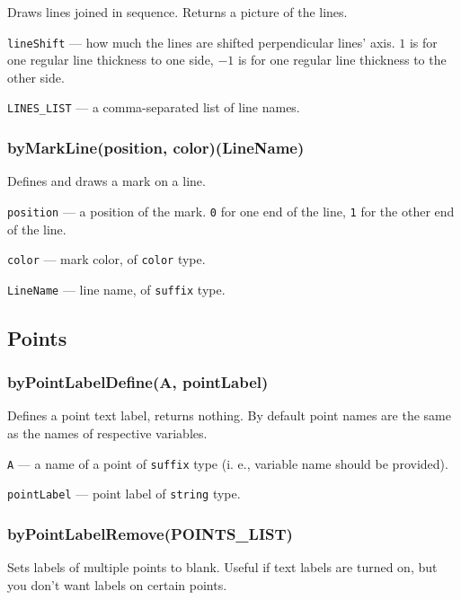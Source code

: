 \documentclass{ltxdoc}
\begin{document}
	Draws lines joined in sequence. Returns a picture of the lines.
	
	\texttt{lineShift} — how much the lines are shifted perpendicular lines' axis. \texttt{$1$} is for one regular line thickness to one side, \texttt{$-1$} is for one regular line thickness to the other side.
	
	\texttt{LINES\_LIST} — a comma-separated list of line names.

\subsubsection{byMarkLine(position, color)(LineName)}\label{byMarkLine}

	Defines and draws a mark on a line.
	
	\texttt{position} — a position of the mark. \texttt{0} for one end of the line, \texttt{1} for the other end of the line.
	
	\texttt{color} — mark color, of \texttt{color} type.
	
	\texttt{LineName} — line name, of \texttt{suffix} type.


\subsection{Points}

\subsubsection{byPointLabelDefine(A, pointLabel)}\label{byPointLabelDefine}

Defines a point text label, returns nothing. By default point names are the same as the names of respective variables.

\texttt{A} — a name of a point of \texttt{suffix} type  (i. e., variable name should be provided).

\texttt{pointLabel} — point label of \texttt{string} type.

\subsubsection{byPointLabelRemove(POINTS\_LIST)}\label{byPointLabelRemove}

Sets labels of multiple points to blank. Useful if text labels are turned on, but you don't want labels on certain points.
\end{document}
